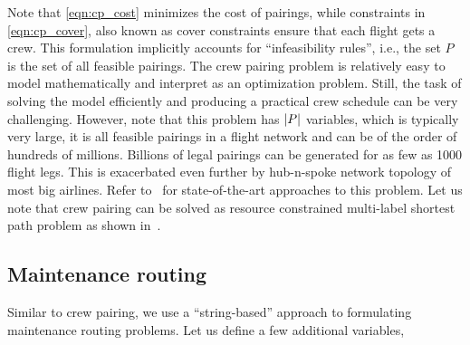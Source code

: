 \documentclass[letterpaper, 10pt, twocolumn, reqno]{amsart}
\begin{document}
Note that \eqref{eqn:cp_cost} minimizes the cost of pairings, while constraints in \eqref{eqn:cp_cover}, also known as cover constraints ensure that each flight gets a crew. This formulation implicitly accounts for ``infeasibility rules'', i.e., the set $P$ is the set of all feasible pairings.
The crew pairing problem is relatively easy to
model mathematically and interpret as an optimization problem. Still, the task of solving the model efficiently and producing a practical crew schedule can be very challenging. However, note that this problem has $\left| P \right|$ variables, which is typically very large, it is all feasible pairings in a flight network and can be of the order of hundreds of millions. Billions of legal pairings can be generated for as few as 1000 flight legs. This is exacerbated even further by hub-n-spoke network topology of most big airlines. Refer to~\cite{} for state-of-the-art approaches to this problem. Let us note that crew pairing can be solved as resource constrained multi-label shortest path problem as shown in~\cite{gopalakrishnan2005airline}.



\subsection{Maintenance routing}
\label{ssec:maintenance_routing}

Similar to crew pairing, we use a ``string-based'' approach to formulating maintenance routing problems. Let us define a few additional variables,
\end{document}
